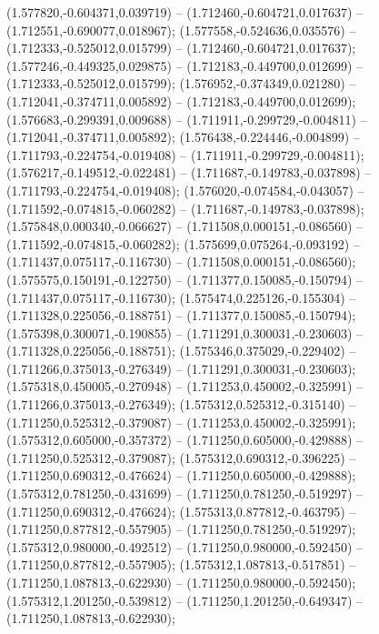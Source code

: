  (1.577820,-0.604371,0.039719) -- (1.712460,-0.604721,0.017637) -- (1.712551,-0.690077,0.018967);
 (1.577558,-0.524636,0.035576) -- (1.712333,-0.525012,0.015799) -- (1.712460,-0.604721,0.017637);
 (1.577246,-0.449325,0.029875) -- (1.712183,-0.449700,0.012699) -- (1.712333,-0.525012,0.015799);
 (1.576952,-0.374349,0.021280) -- (1.712041,-0.374711,0.005892) -- (1.712183,-0.449700,0.012699);
 (1.576683,-0.299391,0.009688) -- (1.711911,-0.299729,-0.004811) -- (1.712041,-0.374711,0.005892);
 (1.576438,-0.224446,-0.004899) -- (1.711793,-0.224754,-0.019408) -- (1.711911,-0.299729,-0.004811);
 (1.576217,-0.149512,-0.022481) -- (1.711687,-0.149783,-0.037898) -- (1.711793,-0.224754,-0.019408);
 (1.576020,-0.074584,-0.043057) -- (1.711592,-0.074815,-0.060282) -- (1.711687,-0.149783,-0.037898);
 (1.575848,0.000340,-0.066627) -- (1.711508,0.000151,-0.086560) -- (1.711592,-0.074815,-0.060282);
 (1.575699,0.075264,-0.093192) -- (1.711437,0.075117,-0.116730) -- (1.711508,0.000151,-0.086560);
 (1.575575,0.150191,-0.122750) -- (1.711377,0.150085,-0.150794) -- (1.711437,0.075117,-0.116730);
 (1.575474,0.225126,-0.155304) -- (1.711328,0.225056,-0.188751) -- (1.711377,0.150085,-0.150794);
 (1.575398,0.300071,-0.190855) -- (1.711291,0.300031,-0.230603) -- (1.711328,0.225056,-0.188751);
 (1.575346,0.375029,-0.229402) -- (1.711266,0.375013,-0.276349) -- (1.711291,0.300031,-0.230603);
 (1.575318,0.450005,-0.270948) -- (1.711253,0.450002,-0.325991) -- (1.711266,0.375013,-0.276349);
 (1.575312,0.525312,-0.315140) -- (1.711250,0.525312,-0.379087) -- (1.711253,0.450002,-0.325991);
 (1.575312,0.605000,-0.357372) -- (1.711250,0.605000,-0.429888) -- (1.711250,0.525312,-0.379087);
 (1.575312,0.690312,-0.396225) -- (1.711250,0.690312,-0.476624) -- (1.711250,0.605000,-0.429888);
 (1.575312,0.781250,-0.431699) -- (1.711250,0.781250,-0.519297) -- (1.711250,0.690312,-0.476624);
 (1.575313,0.877812,-0.463795) -- (1.711250,0.877812,-0.557905) -- (1.711250,0.781250,-0.519297);
 (1.575312,0.980000,-0.492512) -- (1.711250,0.980000,-0.592450) -- (1.711250,0.877812,-0.557905);
 (1.575312,1.087813,-0.517851) -- (1.711250,1.087813,-0.622930) -- (1.711250,0.980000,-0.592450);
 (1.575312,1.201250,-0.539812) -- (1.711250,1.201250,-0.649347) -- (1.711250,1.087813,-0.622930);
